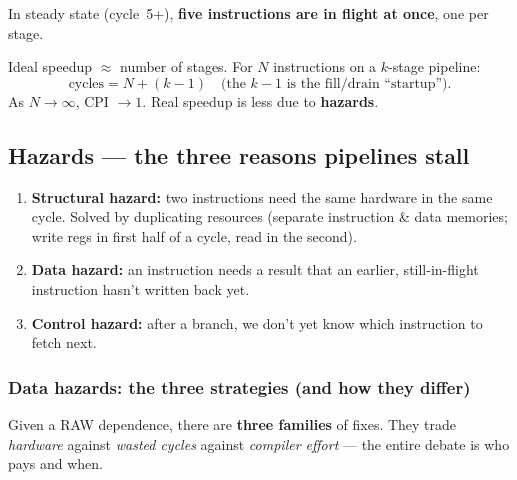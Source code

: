 \documentclass[10pt]{article}
\begin{document}
\begin{center}
\end{center}
In steady state (cycle~5+), \textbf{five instructions are in flight at once}, one per stage.

\begin{formbox}
Ideal speedup $\approx$ number of stages. For $N$ instructions on a $k$-stage pipeline:
\[ \text{cycles} = N + (k-1)\quad(\text{the }k-1\text{ is the fill/drain ``startup'').}\]
As $N\to\infty$, CPI $\to 1$. Real speedup is less due to \textbf{hazards}.
\end{formbox}

\subsection{Hazards --- the three reasons pipelines stall}
\begin{enumerate}
\item \textbf{Structural hazard:} two instructions need the same hardware in the same cycle.
Solved by duplicating resources (separate instruction \& data memories; write regs in first half
of a cycle, read in the second).
\item \textbf{Data hazard:} an instruction needs a result that an earlier, still-in-flight
instruction hasn't written back yet.
\item \textbf{Control hazard:} after a branch, we don't yet know which instruction to fetch next.
\end{enumerate}

\subsubsection{Data hazards: the three strategies (and how they differ)}
Given a RAW dependence, there are \textbf{three families} of fixes. They trade \emph{hardware}
against \emph{wasted cycles} against \emph{compiler effort} --- the entire debate is who pays and when.
\end{document}

